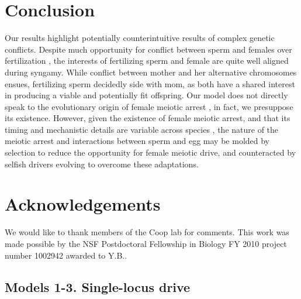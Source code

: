 \documentclass[12pt,letterpaper]{article}
\begin{document}
\section*{Conclusion}
Our results highlight potentially counterintuitive results of complex genetic conflicts. 
Despite much opportunity for conflict between sperm and females over fertilization \citep{Partridge1998},
	the interests of fertilizing sperm and female are quite well aligned during syngamy.
While conflict between mother and her alternative chromosomes ensues, 
	fertilizing sperm decidedly side with mom, as both have a shared interest in producing a viable and potentially fit offspring. 
Our model does not directly speak to the evolutionary origin of
  female meiotic arrest \citep[for a review and evaluation of such
  hypotheses see][]{Mira1998}, in fact, we presuppose its existence.
However, given the existence of female meiotic arrest, 
	and that its timing and mechanistic details are variable
        across species \citep[Supplementary Figure XXX, and][ ]{Masui_book,Karrbook:09},
	the nature of the meiotic arrest and interactions between
        sperm and egg may  be molded by selection to reduce the opportunity for female meiotic drive, 
	and counteracted by selfish drivers evolving to overcome these adaptations. 

\newpage 
\section*{Acknowledgements}
We would like to thank members of the Coop lab for comments. This work was made possible by the NSF Postdoctoral Fellowship in Biology FY 2010 project number 1002942 awarded to Y.B..
\newpage 

\newpage 
  \appendix


\subsection*{Models 1-3. Single-locus drive}
\end{document}

